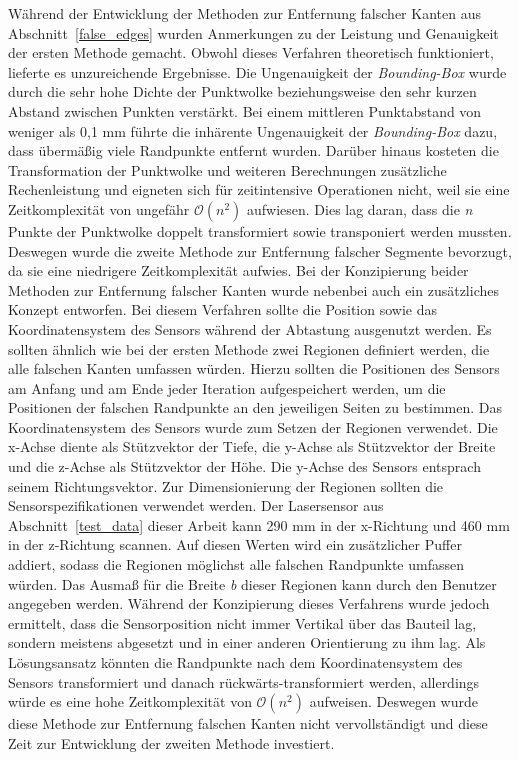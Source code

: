 Während der Entwicklung der Methoden zur Entfernung falscher Kanten aus Abschnitt~\ref{false_edges} wurden Anmerkungen zu der Leistung und Genauigkeit der ersten Methode gemacht. Obwohl dieses Verfahren theoretisch funktioniert, lieferte es unzureichende Ergebnisse. Die Ungenauigkeit der \textit{Bounding-Box} wurde durch die sehr hohe Dichte der Punktwolke beziehungsweise den sehr kurzen Abstand zwischen Punkten verstärkt. Bei einem mittleren Punktabstand von weniger als 0,1 mm führte die inhärente Ungenauigkeit der \textit{Bounding-Box} dazu, dass übermäßig viele Randpunkte entfernt wurden. Darüber hinaus kosteten die Transformation der Punktwolke und weiteren Berechnungen zusätzliche Rechenleistung und eigneten sich für zeitintensive Operationen nicht, weil sie eine Zeitkomplexität von ungefähr $\mathcal{O}(n^2)$ aufwiesen. Dies lag daran, dass die \textit{n} Punkte der Punktwolke doppelt transformiert sowie transponiert werden mussten. Deswegen wurde die zweite Methode zur Entfernung falscher Segmente bevorzugt, da sie eine niedrigere Zeitkomplexität aufwies. Bei der Konzipierung beider Methoden zur Entfernung falscher Kanten wurde nebenbei auch ein zusätzliches Konzept entworfen. Bei diesem Verfahren sollte die Position sowie das Koordinatensystem des Sensors während der Abtastung ausgenutzt werden. Es sollten ähnlich wie bei der ersten Methode zwei Regionen definiert werden, die alle falschen Kanten umfassen würden. Hierzu sollten die Positionen des Sensors am Anfang und am Ende jeder Iteration aufgespeichert werden, um die Positionen der falschen Randpunkte an den jeweiligen Seiten zu bestimmen. Das Koordinatensystem des Sensors wurde zum Setzen der Regionen verwendet. Die x-Achse diente als Stützvektor der Tiefe, die y-Achse als Stützvektor der Breite und die z-Achse als Stützvektor der Höhe. Die y-Achse des Sensors entsprach seinem Richtungsvektor. Zur Dimensionierung der Regionen sollten die Sensorspezifikationen verwendet werden. Der Lasersensor aus Abschnitt~\ref{test_data} dieser Arbeit kann 290 mm in der x-Richtung und 460 mm in der z-Richtung scannen. Auf diesen Werten wird ein zusätzlicher Puffer addiert, sodass die Regionen möglichst alle falschen Randpunkte umfassen würden. Das Ausmaß für die Breite \textit{b} dieser Regionen kann durch den Benutzer angegeben werden. Während der Konzipierung dieses Verfahrens wurde jedoch ermittelt, dass die Sensorposition nicht immer Vertikal über das Bauteil lag, sondern meistens abgesetzt und in einer anderen Orientierung zu ihm lag. Als Lösungsansatz könnten die Randpunkte nach dem Koordinatensystem des Sensors transformiert und danach rückwärts-transformiert werden, allerdings würde es eine hohe Zeitkomplexität von $\mathcal{O}(n^2)$ aufweisen. Deswegen wurde diese Methode zur Entfernung falschen Kanten nicht vervollständigt und diese Zeit zur Entwicklung der zweiten Methode investiert. 

